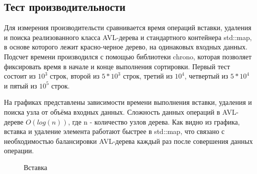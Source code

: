 \documentclass[12pt]{article}
\begin{document}
\subsection*{Тест производительности}

Для измерения производительсти сравнивается время операций вставки, удаления и поиска реализованного класса AVL-дерева и стандартного контейнера std::map, в основе которого лежит красно-черное дерево, на одинаковых входных данных. Подсчет времени производился с помощью библиотеки chrono, которая позволяет фиксировать время в начале и конце выполнения сортировки. Первый тест состоит из $10^3$ строк, второй из $5 *10^3$ строк, третий из $10^4$, четвертый из $5 * 10^4$ и пятый из $10^5$ строк.

На графиках представлены зависимости времени выполнения вставки, удаления и поиска узла от объёма входных данных. Сложность данных операций в AVL-дереве $O(log(n))$, где n - количество узлов дерева. Как видно из графика, вставка и удаление элемента работают быстрее в std::map, что связано с необходимостью балансировки AVL-дерева каждый раз после совершения данных операции.


\begin{figure}[htbp]
    \centering
    \caption{Вставка}
    \label{fig:graph}
\end{figure}
\end{document}
